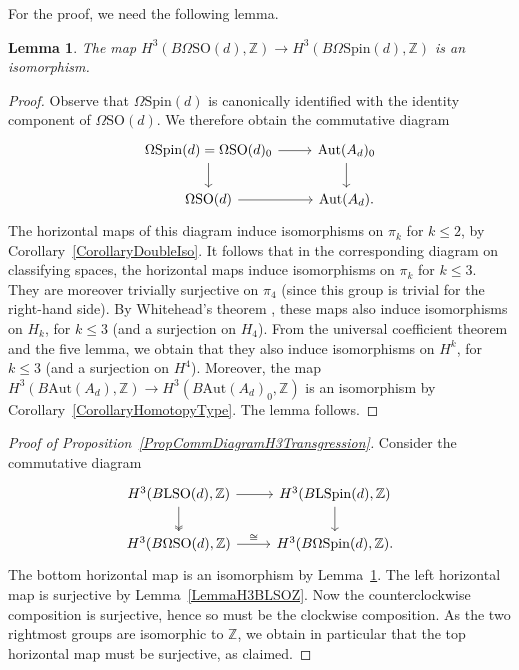\documentclass[10pt,a4paper]{amsart}
\numberwithin{equation}{section}
\newtheorem{Lemma}[Theorem]{Lemma}
\newcommand{\Z}{\mathbb{Z}}
\newcommand{\SO}{\mathrm{SO}}
\newcommand{\Aut}{\mathrm{Aut}}
\newcommand{\Spin}{\mathrm{Spin}}
\renewcommand{\L}{\mathrm{L}}
\begin{document}
For the proof, we need the following lemma.

\begin{Lemma} \label{LemmaH3IsoSoSpin}
The map $H^3(B\Omega\SO(d), \Z) \to H^3(B\Omega\Spin(d), \Z)$ is an isomorphism.
\end{Lemma}

\begin{proof}
Observe that $\Omega\Spin(d)$ is canonically identified with the identity component of $\Omega\SO(d)$.
We therefore obtain the commutative diagram
\begin{equation*}
\begin{tikzcd}
 \Omega \Spin(d) = \Omega \SO(d)_0 \ar[r] \ar[d] & \Aut(A_d)_0 \ar[d] \\
 \Omega \SO(d) \ar[r] & \Aut(A_d).
\end{tikzcd}
\end{equation*}
The horizontal maps of this diagram induce isomorphisms on $\pi_k$ for $k\leq 2$, by Corollary~\ref{CorollaryDoubleIso}.
It follows that in the corresponding diagram on classifying spaces, the horizontal maps induce isomorphisms on $\pi_k$ for $k \leq 3$.
They are moreover trivially surjective on $\pi_4$ (since this group is trivial for the right-hand side).
By Whitehead's theorem \cite[Theorem~10.28]{Switzer}, these maps also induce isomorphisms on $H_k$, for $k \leq 3$ (and a surjection on $H_4$).
From the universal coefficient theorem and the five lemma, we obtain that they also induce isomorphisms on $H^k$, for $k \leq 3$ (and a surjection on $H^4$).
Moreover, the map $H^3(B\Aut(A_d), \Z) \to H^3(B\Aut(A_d)_0, \Z)$ is an isomorphism by Corollary~\ref{CorollaryHomotopyType}.
The lemma follows.
\end{proof}

\begin{proof}[Proof of Proposition~\ref{PropCommDiagramH3Transgression}]
Consider the commutative diagram
\begin{equation*}
\begin{tikzcd}
 H^3(B\L\SO(d), \Z) \ar[d, two heads] \ar[r] & H^{3}(B\L\Spin(d), \Z) \ar[d]\\
 H^3(B\Omega\SO(d), \Z) \ar[r, "\cong"] & H^3(B\Omega\Spin(d), \Z).
 \end{tikzcd}
\end{equation*}
The bottom horizontal map is an isomorphism by Lemma~\ref{LemmaH3IsoSoSpin}.
The left horizontal map is surjective by Lemma~\ref{LemmaH3BLSOZ}.
Now the counterclockwise composition is surjective, hence so must be the clockwise composition.
As the two rightmost groups are isomorphic to $\Z$, we obtain in particular that the top horizontal map must be surjective, as claimed.
\end{proof}
\end{document}

